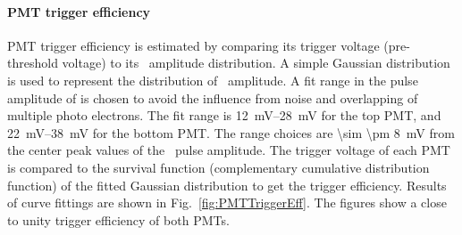\paragraph{PMT trigger efficiency}
PMT trigger efficiency is estimated by comparing its trigger voltage (pre-threshold voltage) to its \sphe\ amplitude distribution. A simple Gaussian distribution is used to represent the distribution of \sphe\ amplitude. A fit range in the pulse amplitude of is chosen to avoid the influence from noise and overlapping of multiple photo electrons. The fit range is \SIrange{12}{28}{\mV} for the top PMT, and \SIrange{22}{38}{\mV} for the bottom PMT. The range choices are \SI{\sim \pm 8}{\mV} from the center peak values of the \sphe\ pulse amplitude. The trigger voltage of each PMT is compared to the survival function (complementary cumulative distribution function) of the fitted Gaussian distribution to get the trigger efficiency. Results of curve fittings are shown in Fig.~\ref{fig:PMTTriggerEff}. The figures show a close to unity trigger efficiency of both PMTs.
  
